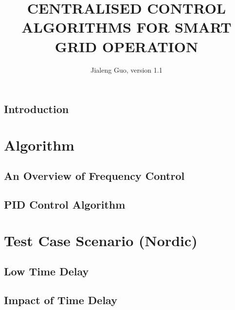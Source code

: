 \documentclass[12pt]{report}
\begin{document}
\title{CENTRALISED CONTROL ALGORITHMS FOR SMART GRID OPERATION}
\author{Jialeng Guo, version 1.1}



\beforepreface


\afterpreface
\hypersetup{linkcolor=magenta}



\chapter{Introduction}
\label{chapter:intro}





\part{Algorithm}

\chapter{An Overview of Frequency Control}
\label{Chapter2}


\chapter{PID Control Algorithm}
\label{Chapter3}






\part{Test Case Scenario (Nordic)}

\chapter{Low Time Delay}
\label{Chapter4}





\chapter{Impact of Time Delay}
\label{Chapter5}




\end{document}
